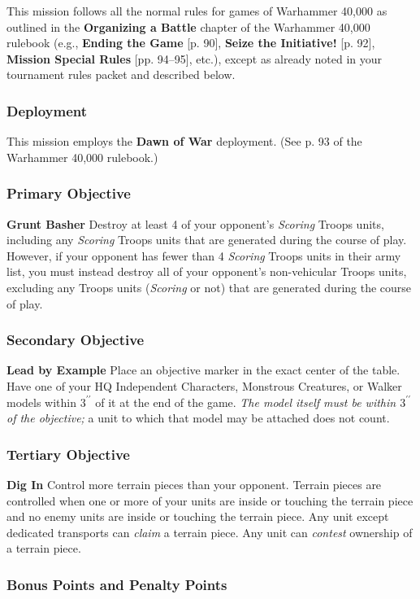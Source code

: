 \documentclass[12pt,titlepage]{article}
\newcommand{\inches}[1]{$#1^{\prime\prime}$}
\newcommand{\paragraphsmall}[1]{\noindent\textbf{#1}\quad}
\newcommand{\gameboilerplate}{This mission follows all the normal rules for games of Warhammer 40,000 as outlined in the \textbf{Organizing a Battle} chapter of the Warhammer 40,000 rulebook (e.g., \textbf{Ending the Game} [p. 90], \textbf{Seize the Initiative!} [p. 92], \textbf{Mission Special Rules} [pp. 94--95], etc.), except as already noted in your tournament rules packet and described below.}
\newcommand{\dawnofwar}{This mission employs the \textbf{Dawn of War} deployment. (See p. 93 of the Warhammer 40,000 rulebook.)}
\begin{document}
{\footnotesize
\gameboilerplate

\subsubsection*{Deployment}

\dawnofwar

\subsubsection*{Primary Objective}

\paragraphsmall{Grunt Basher} Destroy at least 4 of your opponent's \textit{Scoring} Troops units, including any \textit{Scoring} Troops units that are generated during the course of play. However, if your opponent has fewer than 4 \textit{Scoring} Troops units in their army list, you must instead destroy all of your opponent's non-vehicular Troops units, excluding any Troops units (\textit{Scoring} or not) that are generated during the course of play.

\subsubsection*{Secondary Objective}

\paragraphsmall{Lead by Example} Place an objective marker in the exact center of the table. Have one of your HQ Independent Characters, Monstrous Creatures, or Walker models within \inches{3} of it at the end of the game. \textit{The model itself must be within \inches{3} of the objective;} a unit to which that model may be attached does not count.

\subsubsection*{Tertiary Objective}

\paragraphsmall{Dig In} Control more terrain pieces than your opponent. Terrain pieces are controlled when one or more of your units are inside or touching the terrain piece and no enemy units are inside or touching the terrain piece. Any unit except dedicated transports can \textit{claim} a terrain piece. Any unit can \textit{contest} ownership of a terrain piece.

\subsubsection*{Bonus Points and Penalty Points}

}
\end{document}
